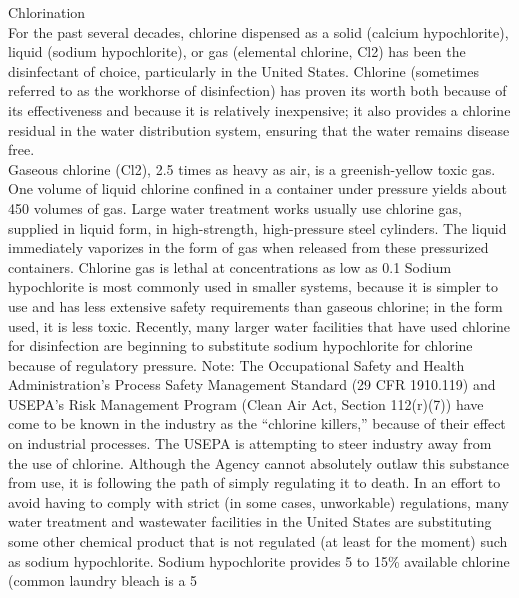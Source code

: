 \documentclass{article}
\begin{document}
Chlorination\\
For the past several decades, chlorine dispensed as a solid (calcium hypochlorite), liquid (sodium hypochlorite), or gas (elemental chlorine, Cl2) has been the disinfectant of choice, particularly in the United States. Chlorine (sometimes referred to as the workhorse of disinfection) has proven its worth both because of its effectiveness and because it is relatively inexpensive; it also provides a chlorine residual in the water distribution system, ensuring that the water remains disease free.\\
Gaseous chlorine (Cl2), 2.5 times as heavy as air, is a greenish-yellow toxic gas. One volume of liquid chlorine confined in a container under pressure yields about 450 volumes of gas. Large water treatment works usually use chlorine gas, supplied in liquid form, in high-strength, high-pressure steel cylinders. The liquid immediately vaporizes in the form of gas when released from these pressurized containers. Chlorine gas is lethal at concentrations as low as 0.1%
Sodium hypochlorite is most commonly used in smaller systems, because it is simpler to use and has less extensive safety requirements than gaseous chlorine; in the form used, it is less toxic. Recently, many larger water facilities that have used chlorine for disinfection are beginning to substitute sodium hypochlorite for chlorine because of regulatory pressure.
Note: The Occupational Safety and Health Administration’s Process Safety Management Standard (29 CFR 1910.119) and USEPA’s Risk Management Program (Clean Air Act, Section 112(r)(7)) have come to be known in the industry as the “chlorine killers,” because of their effect on industrial processes. The USEPA is attempting to steer industry away from the use of chlorine. Although the Agency cannot absolutely outlaw this substance from use, it is following the path of simply regulating it to death. In an effort to avoid having to comply with strict (in some cases, unworkable) regulations, many water treatment and wastewater facilities in the United States are substituting some other chemical product that is not regulated (at least for the moment) such as sodium hypochlorite. Sodium hypochlorite provides 5 to 15\% available chlorine (common laundry bleach is a 5%
\end{document}
